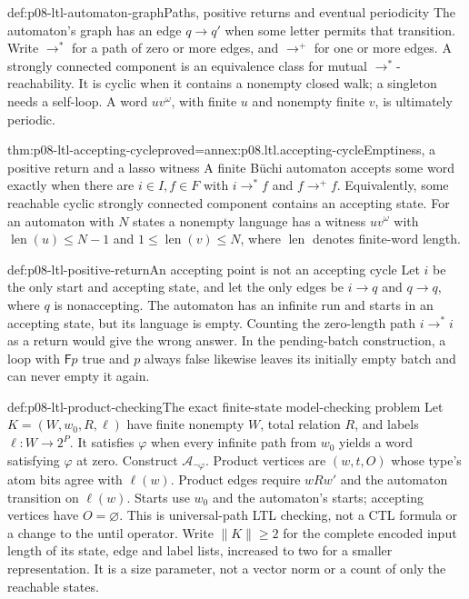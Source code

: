 \begin{hbdefinition}{def:p08-ltl-automaton-graph}{Paths, positive returns and eventual periodicity}
The automaton's graph has an edge \(q\to q'\) when some
letter permits that transition. Write \(\to^*\) for a path
of zero or more edges, and \(\to^+\) for one or more edges.
A strongly connected component is an equivalence class for
mutual \(\to^*\)-reachability. It is cyclic when it contains
a nonempty closed walk; a singleton needs a self-loop.
A word \(uv^\omega\), with finite \(u\) and nonempty finite
\(v\), is ultimately periodic.
\end{hbdefinition}

\begin{hbtheorem}{thm:p08-ltl-accepting-cycle}{proved=annex:p08.ltl.accepting-cycle}{Emptiness, a positive return and a lasso witness}
A finite B\"uchi automaton accepts some word exactly when
there are \(i\in I,f\in F\) with
\(i\to^*f\) and \(f\to^+f\). Equivalently, some reachable
cyclic strongly connected component contains an accepting state.
For an automaton with \(N\) states a nonempty language has a
witness \(uv^\omega\) with \(\operatorname{len}(u)\leq N-1\)
and \(1\leq\operatorname{len}(v)\leq N\), where
\(\operatorname{len}\) denotes finite-word length.
\end{hbtheorem}

\begin{hbexample}{def:p08-ltl-positive-return}{An accepting point is not an accepting cycle}
Let \(i\) be the only start and accepting state, and let the
only edges be \(i\to q\) and \(q\to q\), where \(q\)
is nonaccepting. The automaton has an infinite run and starts
in an accepting state, but its language is empty. Counting the
zero-length path \(i\to^*i\) as a return would give the
wrong answer. In the pending-batch construction, a loop with
\(\mathsf Fp\) true and \(p\) always false likewise leaves
its initially empty batch and can never empty it again.
\end{hbexample}

\begin{hbdefinition}{def:p08-ltl-product-checking}{The exact finite-state model-checking problem}
Let \(K=(W,w_0,R,\ell)\) have finite nonempty \(W\),
total relation \(R\), and labels \(\ell:W\to2^P\).
It satisfies \(\varphi\) when every infinite path from
\(w_0\) yields a word satisfying \(\varphi\) at zero.
Construct \(\mathcal A_{\neg\varphi}\). Product vertices
are \((w,t,O)\) whose type's atom bits agree with \(\ell(w)\).
Product edges require \(wRw'\) and the automaton transition
on \(\ell(w)\). Starts use \(w_0\) and the automaton's
starts; accepting vertices have \(O=\varnothing\).
This is universal-path LTL checking, not a CTL formula or a
change to the until operator.
Write \(\lVert K\rVert\geq2\) for the complete encoded
input length of its state, edge and label lists, increased to
two for a smaller representation. It is a size parameter,
not a vector norm or a count of only the reachable states.
\end{hbdefinition}

